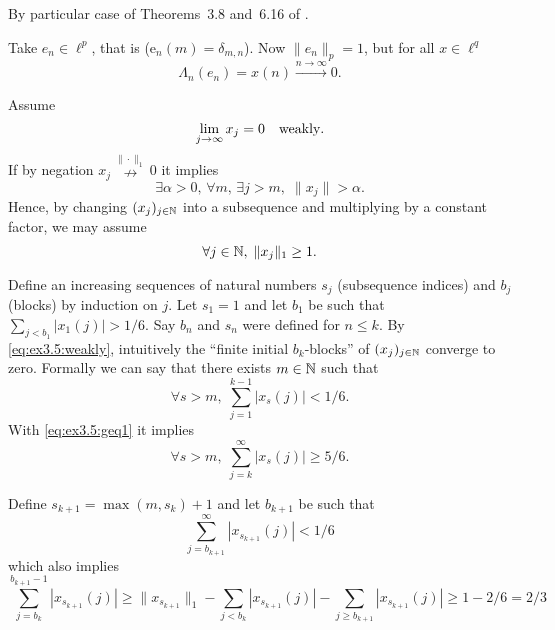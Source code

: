 \begin{enumerate}
\begin{itemize}
By particular case of Theorems~3.8 and~6.16 of \cite{RudinRCA87}.

Take \(e_n\in \ell^p\), that is (e\(_n(m) = \delta_{m,n}\)).
Now \(\|e_n\|_p = 1\), but for all \(x\in\ell^q\)
\begin{equation*}
\Lambda_n(e_n) = x(n) \xrightarrow {n\to\infty}  0.
\end{equation*}

Assume
\begin{equation} \label{eq:ex3.5:weakly}
\lim_{j\to\infty}x_j = 0 \quad \textnormal{weakly}.
\end{equation}
If by negation
\(x_j \stackrel{\|\cdot\|_1}{\nrightarrow} 0\)
it implies
\begin{equation*}
\exists \alpha>0,\,\forall m,\,\exists j>m,\; \|x_j\|>\alpha.
\end{equation*}
Hence, by changing \((x_j)_{j\in\mathbb{N}}\) into a subsequence and multiplying
by a constant factor, we may assume
\begin{equation} \label{eq:ex3.5:geq1}
\forall j\in\mathbb{N},\; \|x_j\|_1 \geq 1.
\end{equation}

Define an increasing sequences of natural numbers
\(s_j\) (subsequence indices)
and
\(b_j\) (blocks)
by induction on $j$.
Let \(s_1=1\) and let \(b_1\) be such that \(\sum_{j<b_1} |x_1(j)| > 1/6\).
Say \(b_n\) and \(s_n\) were defined for \(n\leq k\).
By \eqref{eq:ex3.5:weakly}, intuitively the
``finite initial \(b_{k}\)-blocks'' of
\((x_j)_{j\in\mathbb{N}}\) converge to zero. Formally we can say that
there exists \(m\in\mathbb{N}\) such that
\begin{equation*}
\forall s>m,\; \sum_{j=1}^{k-1} |x_s(j)| < 1/6.
\end{equation*}
With \eqref{eq:ex3.5:geq1} it implies
\begin{equation*}
\forall s>m,\; \sum_{j=k}^\infty |x_s(j)| \geq 5/6.
\end{equation*}

Define \(s_{k+1} = \max(m,s_k)+1\)
and let \(b_{k+1}\) be such that
\begin{equation*}
\sum_{j = b_{k+1}}^\infty |x_{s_{k+1}}(j)| < 1/6
\end{equation*}
which also implies
\begin{equation*}
\sum_{j=b_k}^{b_{k+1}-1} |x_{s_{k+1}}(j)|
\geq \|x_{s_{k+1}}\|_1
     - \sum_{j < b_k} |x_{s_{k+1}}(j)|
     - \sum_{j \geq b_{k+1}} |x_{s_{k+1}}(j)|
\geq 1 - 2/6 = 2/3
\end{equation*}


\end{itemize}
\end{enumerate}
